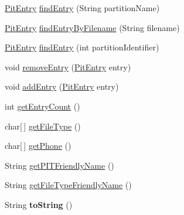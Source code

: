 \begin{DoxyCompactItemize}
\item 
\hyperlink{class_c_a_s_u_a_l_1_1archiving_1_1libpit_1_1_pit_entry}{Pit\-Entry} \hyperlink{class_c_a_s_u_a_l_1_1archiving_1_1libpit_1_1_pit_data_ab1a4b23f0380c3e2ce26d85e519bd15a}{find\-Entry} (String partition\-Name)
\item 
\hyperlink{class_c_a_s_u_a_l_1_1archiving_1_1libpit_1_1_pit_entry}{Pit\-Entry} \hyperlink{class_c_a_s_u_a_l_1_1archiving_1_1libpit_1_1_pit_data_ac07383ca9cf4750eb9de5cdf1690121f}{find\-Entry\-By\-Filename} (String filename)
\item 
\hyperlink{class_c_a_s_u_a_l_1_1archiving_1_1libpit_1_1_pit_entry}{Pit\-Entry} \hyperlink{class_c_a_s_u_a_l_1_1archiving_1_1libpit_1_1_pit_data_a5d139fcadf351b81b00298f1578a9cc5}{find\-Entry} (int partition\-Identifier)
\item 
void \hyperlink{class_c_a_s_u_a_l_1_1archiving_1_1libpit_1_1_pit_data_a2102b1e03aa2de4c6d80f8e43576b06d}{remove\-Entry} (\hyperlink{class_c_a_s_u_a_l_1_1archiving_1_1libpit_1_1_pit_entry}{Pit\-Entry} entry)
\item 
void \hyperlink{class_c_a_s_u_a_l_1_1archiving_1_1libpit_1_1_pit_data_aea22df6b38acde79df88ea8255e60ec2}{add\-Entry} (\hyperlink{class_c_a_s_u_a_l_1_1archiving_1_1libpit_1_1_pit_entry}{Pit\-Entry} entry)
\item 
int \hyperlink{class_c_a_s_u_a_l_1_1archiving_1_1libpit_1_1_pit_data_a64a120bc22b1061952e01188a30f7eeb}{get\-Entry\-Count} ()
\item 
char\mbox{[}$\,$\mbox{]} \hyperlink{class_c_a_s_u_a_l_1_1archiving_1_1libpit_1_1_pit_data_a07f12e00c2077eebc28fc251f87752f8}{get\-File\-Type} ()
\item 
char\mbox{[}$\,$\mbox{]} \hyperlink{class_c_a_s_u_a_l_1_1archiving_1_1libpit_1_1_pit_data_a1cdc24d3cdfdd1e716a856fb3cb2c22d}{get\-Phone} ()
\item 
String \hyperlink{class_c_a_s_u_a_l_1_1archiving_1_1libpit_1_1_pit_data_ab1c581d014e995eab5c36c72ef8c4417}{get\-P\-I\-T\-Friendly\-Name} ()
\item 
String \hyperlink{class_c_a_s_u_a_l_1_1archiving_1_1libpit_1_1_pit_data_a16d06e906b55316b5559420e93ead64d}{get\-File\-Type\-Friendly\-Name} ()
\item 
\hypertarget{class_c_a_s_u_a_l_1_1archiving_1_1libpit_1_1_pit_data_a9f65e9c2ef9988d9dae1fbd30fd0b9fc}{String {\bfseries to\-String} ()}\label{class_c_a_s_u_a_l_1_1archiving_1_1libpit_1_1_pit_data_a9f65e9c2ef9988d9dae1fbd30fd0b9fc}


\end{DoxyCompactItemize}
